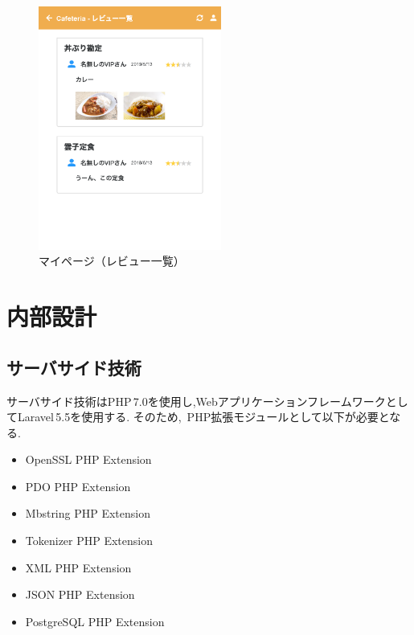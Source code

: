 \documentclass[a4paper]{ltjsarticle}
\begin{document}
        \begin{figure}[ht]
            \center
            \includegraphics[width=60mm]{ui/review-list.png}
            \caption{マイページ（レビュー一覧）}
            \label{img:review-list}
        \end{figure}

\section{内部設計}
    \subsection{サーバサイド技術}
        サーバサイド技術はPHP\,7.0を使用し,WebアプリケーションフレームワークとしてLaravel\,5.5を使用する.
        そのため,\, PHP拡張モジュールとして以下が必要となる.
        \begin{itemize}
            \item OpenSSL PHP Extension
            \item PDO PHP Extension
            \item Mbstring PHP Extension
            \item Tokenizer PHP Extension
            \item XML PHP Extension
            \item JSON PHP Extension
            \item PostgreSQL PHP Extension
        \end{itemize}
\end{document}
